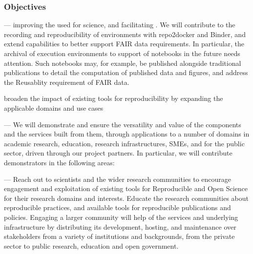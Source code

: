 
\subsubsection{Objectives}\label{sect:objectives}
\begin{compactenum}

\item \label{obj:reproducibility}  ---
  improving the 
  used for science, and facilitating .
  We will contribute to the recording and reproducibility
  of environments with repo2docker and Binder,
  and extend capabilities to better support FAIR
  data requirements. In particular, the archival of execution
  environments to support  of notebooks in the future
  needs attention. Such notebooks may, for example, be published alongside
  traditional publications to detail the computation of published data
  and figures, and address the Reusablity requirement of FAIR data.

\item \label{obj:broaden} broaden the impact of existing tools for reproducibility by expanding the applicable domains and use cases
\item \label{obj:demonstrators}
   ---
  We will demonstrate and ensure the versatility and value of the components and
  the services built from them,
  through applications to a number of
  domains in academic research, education, research infrastructures, SMEs, and for
  the public sector, driven through our project partners. In
  particular, we will contribute demonstrators in the following areas:

\item \label{obj:education}
   ---
  Reach out to scientists and the wider research
  communities to encourage engagement
  and exploitation of existing tools for Reproducible and Open Science
  for their research domains and interests.
  Educate the research communities about reproducible practices,
  and available tools for reproducible publications and policies.
  Engaging a larger community will help  of
  the services and underlying infrastructure by distributing its
  development, hosting, and maintenance over stakeholders from a
  variety of institutions and backgrounds,
  from the private sector to public research, education
  and open government.




\end{compactenum}
